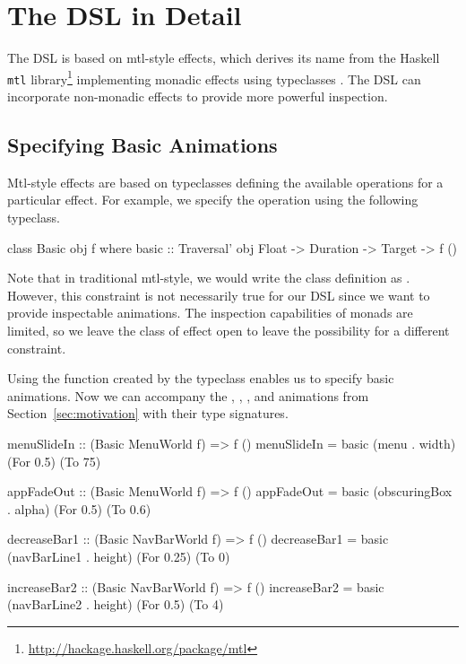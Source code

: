 \section{The DSL in Detail}
\label{sec:detail}

The DSL is based on mtl-style effects, which derives its name from the Haskell \texttt{mtl} library\footnote{\url{http://hackage.haskell.org/package/mtl}} implementing monadic effects using typeclasses \cite{DBLP:conf/afp/Jones95}. The DSL can incorporate non-monadic effects to provide more powerful inspection.


\subsection{Specifying Basic Animations}

Mtl-style effects are based on typeclasses defining the available operations for a particular effect. For example, we specify the  operation using the following typeclass.

\begin{code}
class Basic obj f where
  basic :: Traversal' obj Float -> Duration -> Target -> f ()
\end{code}

Note that in traditional mtl-style, we would write the class definition as . However, this constraint is not necessarily true for our DSL since we want to provide inspectable animations. The inspection capabilities of monads are limited, so we leave the class of effect open to leave the possibility for a different constraint.

Using the  function created by the  typeclass enables us to specify basic animations. Now we can accompany the , , , and  animations from Section~\ref{sec:motivation} with their type signatures.

\begin{code}
menuSlideIn :: (Basic MenuWorld f) => f ()
menuSlideIn = basic (menu . width) (For 0.5) (To 75)

appFadeOut :: (Basic MenuWorld f) => f ()
appFadeOut = basic (obscuringBox . alpha) (For 0.5) (To 0.6)

decreaseBar1 :: (Basic NavBarWorld f) => f ()
decreaseBar1 = basic (navBarLine1 . height) (For 0.25) (To 0)

increaseBar2 :: (Basic NavBarWorld f) => f ()
increaseBar2 = basic (navBarLine2 . height) (For 0.5) (To 4)
\end{code}

